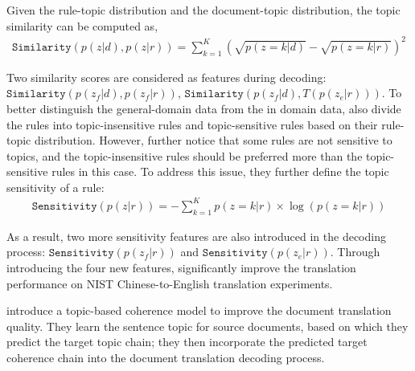 Given the rule-topic distribution and the document-topic distribution, the topic similarity can be computed as,
\begin{align}
\texttt{Similarity}(p(z|d), p(z|r)) = \sum_{k=1}^{K} (\sqrt{p(z=k|d)} - \sqrt{p(z=k|r)})^2
\end{align}

Two similarity scores are considered as features during decoding: $\texttt{Similarity}(p(z_f|d), p(z_f|r))$, $\texttt{Similarity}(p(z_f|d), T(p(z_e|r)))$. To better distinguish the general-domain data from the in domain data, \citet{xiao-12} also divide the rules into topic-insensitive rules and topic-sensitive rules based on their rule-topic distribution. However, \citet{xiao-12} further notice that some rules are not sensitive to topics, and the topic-insensitive rules should be preferred more than the topic-sensitive rules in this case. To address this issue, they further define the topic sensitivity of a rule:
\begin{align}
\texttt{Sensitivity}(p(z|r)) = - \sum_{k=1}^{K} p(z=k|r) \times \log(p(z=k|r))
\end{align}

As a result, two more sensitivity features are also introduced in the decoding process: $\texttt{Sensitivity}(p(z_f|r))$ and $\texttt{Sensitivity}(p(z_e|r))$. Through introducing the four new features, \citet{xiao-12} significantly improve the translation performance on NIST Chinese-to-English translation experiments.


\citet{xiong-13} introduce a topic-based coherence model to improve the document translation quality. They learn the sentence topic for source documents, based on which they predict the target topic chain; they then incorporate the predicted target coherence chain into the document translation decoding process.

